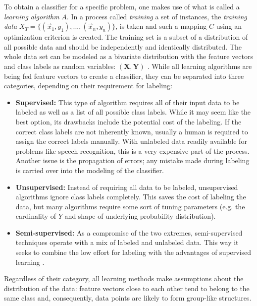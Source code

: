 To obtain a classifier for a specific problem, one makes use of what is called a \textit{learning algorithm} $A$. In a process called \textit{training} a set of instances, the \textit{training data} $X_T = \{(\vec{x}_1, y_1), ..., (\vec{x}_n, y_n)\}$, is taken and such a mapping $C$ using an optimization criterion is created. The training set is a subset of a distribution of all possible data and should be independently and identically distributed. The whole data set can be modeled as a bivariate distribution with the feature vectors and class labels as random variables: $(\mathbf{X}, \mathbf{Y})$ \cite{RodriguezEtAl2013}. While all learning algorithms are being fed feature vectors to create a classifier, they can be separated into three categories, depending on their requirement for labeling:
\begin{itemize}
\item \textbf{Supervised:}
This type of algorithm requires all of their input data to be labeled as well as a list of all possible class labels. While it may seem like the best option, its drawbacks include the potential cost of the labeling. If the correct class labels are not inherently known, usually a human is required to assign the correct labels manually. With unlabeled data readily available for problems like speech recognition, this is a very expensive part of the process. Another issue is the propagation of errors; any mistake made during labeling is carried over into the modeling of the classifier.

\item \textbf{Unsupervised:}
Instead of requiring all data to be labeled, unsupervised algorithms ignore class labels completely. This saves the cost of labeling the data, but many algorithms require some sort of tuning parameters (e.g. the cardinality of $Y$ and shape of underlying probability distribution).

\item \textbf{Semi-supervised:}
As a compromise of the two extremes, semi-supervised techniques operate with a mix of labeled and unlabeled data. This way it seeks to combine the low effort for labeling with the advantages of supervised learning \cite{ZhuEtAl2009}.
\end{itemize}

Regardless of their category, all learning methods make assumptions about the distribution of the data: feature vectors close to each other tend to belong to the same class and, consequently, data points are likely to form group-like structures.

